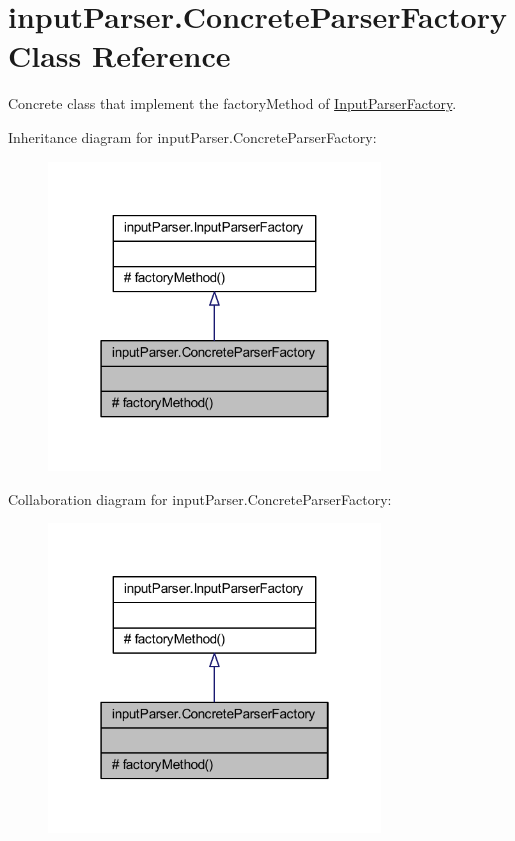 \hypertarget{classinput_parser_1_1_concrete_parser_factory}{\section{input\-Parser.\-Concrete\-Parser\-Factory Class Reference}
\label{classinput_parser_1_1_concrete_parser_factory}
}


Concrete class that implement the factory\-Method of \hyperlink{classinput_parser_1_1_input_parser_factory}{Input\-Parser\-Factory}.  




Inheritance diagram for input\-Parser.\-Concrete\-Parser\-Factory\-:\nopagebreak
\begin{figure}[H]
\begin{center}
\leavevmode
\includegraphics[width=250pt]{classinput_parser_1_1_concrete_parser_factory__inherit__graph}
\end{center}
\end{figure}


Collaboration diagram for input\-Parser.\-Concrete\-Parser\-Factory\-:\nopagebreak
\begin{figure}[H]
\begin{center}
\leavevmode
\includegraphics[width=250pt]{classinput_parser_1_1_concrete_parser_factory__coll__graph}
\end{center}
\end{figure}
